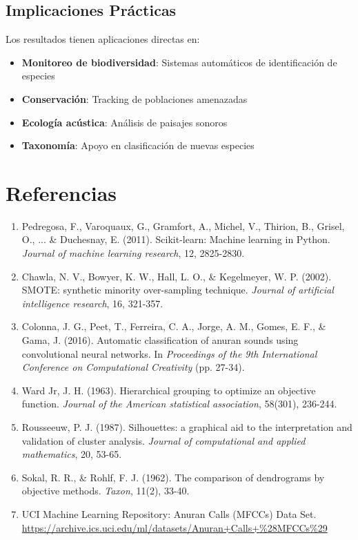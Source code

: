 \documentclass[12pt,a4paper]{article}
\begin{document}
\subsection{Implicaciones Prácticas}
Los resultados tienen aplicaciones directas en:
\begin{itemize}
    \item \textbf{Monitoreo de biodiversidad}: Sistemas automáticos de identificación de especies
    \item \textbf{Conservación}: Tracking de poblaciones amenazadas
    \item \textbf{Ecología acústica}: Análisis de paisajes sonoros
    \item \textbf{Taxonomía}: Apoyo en clasificación de nuevas especies
\end{itemize}


\section{Referencias}
\begin{enumerate}
    \item Pedregosa, F., Varoquaux, G., Gramfort, A., Michel, V., Thirion, B., Grisel, O., ... \& Duchesnay, E. (2011). Scikit-learn: Machine learning in Python. \textit{Journal of machine learning research}, 12, 2825-2830.
    
    \item Chawla, N. V., Bowyer, K. W., Hall, L. O., \& Kegelmeyer, W. P. (2002). SMOTE: synthetic minority over-sampling technique. \textit{Journal of artificial intelligence research}, 16, 321-357.
    
    \item Colonna, J. G., Peet, T., Ferreira, C. A., Jorge, A. M., Gomes, E. F., \& Gama, J. (2016). Automatic classification of anuran sounds using convolutional neural networks. In \textit{Proceedings of the 9th International Conference on Computational Creativity} (pp. 27-34).
    
    \item Ward Jr, J. H. (1963). Hierarchical grouping to optimize an objective function. \textit{Journal of the American statistical association}, 58(301), 236-244.
    
    \item Rousseeuw, P. J. (1987). Silhouettes: a graphical aid to the interpretation and validation of cluster analysis. \textit{Journal of computational and applied mathematics}, 20, 53-65.
    
    \item Sokal, R. R., \& Rohlf, F. J. (1962). The comparison of dendrograms by objective methods. \textit{Taxon}, 11(2), 33-40.
    
    \item UCI Machine Learning Repository: Anuran Calls (MFCCs) Data Set. \url{https://archive.ics.uci.edu/ml/datasets/Anuran+Calls+%28MFCCs%29}
\end{enumerate}
\end{document}
